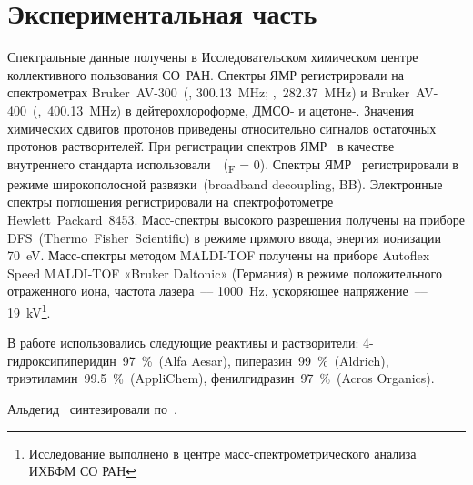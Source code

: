 \section{Экспериментальная часть}

Спектральные данные получены в Исследовательском химическом центре коллективного пользования СО~РАН.
Спектры ЯМР регистрировали на спектрометрах Bruker~AV-300~(, \SI{300.13}{\mega\hertz}; ,~\SI{282.37}{\mega\hertz}) и Bruker~AV-400~(,~\SI{400.13}{\mega\hertz}) в дейтерохлороформе, \mbox{ДМСО-} и \mbox{ацетоне-}.
Значения химических сдвигов протонов приведены относительно сигналов остаточных протонов растворителей̆.
При регистрации спектров ЯМР~ в качестве внутреннего стандарта использовали~~(\chemdelta{}\textsubscript{F} = \SI{0}{\ppm}).
Спектры ЯМР~ регистрировали в режиме широкополосной развязки~(broadband decoupling, BB).
Электронные спектры поглощения регистрировали на спектрофотометре Hewlett~Packard~8453.
Масс-спектры высокого разрешения получены на приборе DFS~(Thermo~Fisher~Scientifiс) в режиме прямого ввода, энергия ионизации \SI{70}{\electronvolt}.
Масс-спектры методом  MALDI-TOF получены на приборе Autoflex Speed MALDI-TOF «Bruker Daltonic» (Германия) в режиме положительного отраженного иона, частота лазера~–-- \SI{1000}{\hertz}, ускоряющее напряжение~–-- \SI{19}{\kilo\volt}\footnote{Исследование выполнено в центре масс-спектрометрического анализа ИХБФМ СО РАН}.

В работе использовались следующие  реактивы и растворители: \mbox{4-гидроксипиперидин}~\SI{97}{\percent}~(Alfa Aesar), пиперазин~\SI{99}{\percent}~(Aldrich), триэтиламин~\SI{99.5}{\percent}~(AppliChem), фенилгидразин~\SI{97}{\percent}~(Acros Organics).

Альдегид~ синтезировали по~\cite{2016a,2010}.

